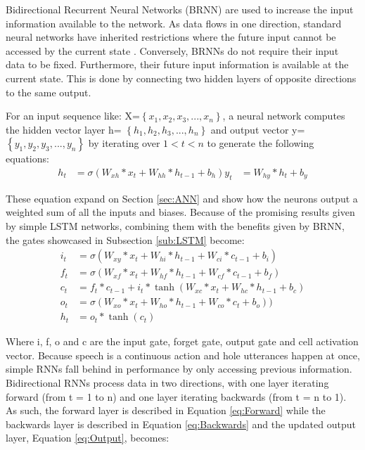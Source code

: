 Bidirectional Recurrent Neural Networks (BRNN) are used to increase the 
input information available to the network. As data flows in one direction, standard neural networks have inherited restrictions where 
the future input cannot be accessed by the current state \cite{graves2005bidirectional}. Conversely,
BRNNs do not require their input data to be fixed. Furthermore, their 
future input information is available at the current state. This is done
by connecting two hidden layers of opposite directions to the same output.

For an input sequence like: X=$\left\{x_1,x_2,x_3,...,x_n \right\}$, a 
neural network computes the hidden vector layer 
h= $\left\{h_1,h_2,h_3,...,h_n \right\}$ and output vector 
y= $\left\{y_1,y_2,y_3,...,y_n \right\}$ by iterating over  $1<t<n$ to generate the following equations:
\begin{align}
h_t &= \sigma(W_{xh}*x_t + W_{hh}*h_{t-1} + b_h)
y_t &= W_{hy}*h_t + b_y
\end{align}

These equation expand on Section \ref{sec:ANN} and show how the neurons output a weighted sum of all the inputs and biases.
Because of the promising results given by simple LSTM networks, combining them with the benefits given by BRNN, the gates showcased in 
Subsection \ref{sub:LSTM} become:
\begin{align}
i_t &= \sigma(W_{xy} * x_t + W_{hi} * h_{t-1} + W_{ci} * c_{t-1} + b_i)
\\
f_t &= \sigma(W_{xf} * x_t + W_{hf} * h_{t-1} + W_{cf} * c_{t-1} + b_f) \\
c_t &= f_t * c_{t-1} + i_{t} * \tanh(W_{xc} * x_t + W_{hc} *  h_{t-1} + b_c)
\\
o_t &= \sigma(W_{xo} * x_t + W_{ho} * h_{t-1} + W_{co} * c_t +b_o))
\\
h_t &= o_t * \tanh(c_t)
\end{align}

Where i, f, o and c are the input gate, forget gate, output gate and cell activation vector. Because speech is a continuous action and hole utterances happen at once, simple RNNs fall behind in performance by only accessing previous information. Bidirectional RNNs process data in
two directions, with one layer iterating  forward (from t = 1 to n) and one layer iterating backwards (from t = n to 1)\cite{graves2013hybrid}. As such, the forward layer is described in Equation \ref{eq:Forward} while the backwards layer is described in Equation \ref{eq:Backwards} and the updated output layer, Equation \ref{eq:Output}, becomes:

